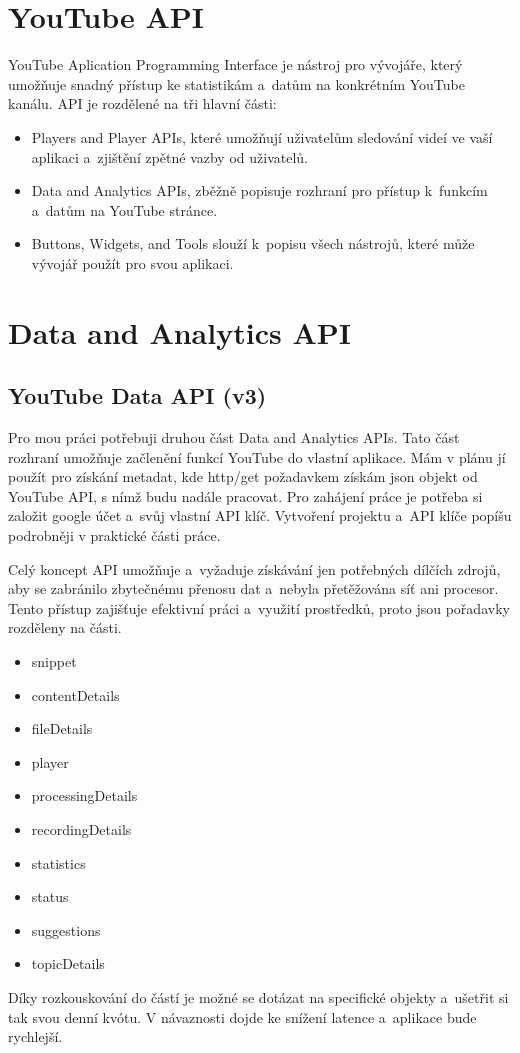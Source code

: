 \section{YouTube API}
\par YouTube Aplication Programming Interface je nástroj pro vývojáře, který umožňuje snadný přístup ke statistikám a~datům na konkrétním YouTube kanálu. API je rozdělené na tři hlavní části:
\begin{itemize}
	\item{Players and Player APIs, které umožňují uživatelům sledování videí ve vaší aplikaci a~zjištění zpětné vazby od uživatelů.}
	\item{Data and Analytics APIs, zběžně popisuje rozhraní pro přístup k~funkcím a~datům na YouTube stránce.}
	\item{Buttons, Widgets, and Tools slouží k~popisu všech nástrojů, které může vývojář použít pro svou aplikaci.}
\end{itemize}

\section{Data and Analytics API}
\subsection{YouTube Data API (v3)}
\par Pro mou práci potřebuji druhou část Data and Analytics APIs. Tato část rozhraní umožňuje začlenění funkcí YouTube do vlastní aplikace. Mám v plánu jí použít pro získání metadat, kde http/get požadavkem získám json objekt od YouTube API, s nímž budu nadále pracovat. Pro zahájení práce je potřeba si založit google účet a~svůj vlastní API klíč. Vytvoření projektu a~API klíče popíšu podrobněji v praktické části práce.
\par Celý koncept API umožňuje a~vyžaduje získávání jen potřebných dílčích zdrojů, aby se zabránilo zbytečnému přenosu dat a~nebyla přetěžována síť ani procesor. Tento přístup zajišťuje efektivní práci a~využití prostředků, proto jsou pořadavky rozděleny na části. 
\begin{itemize} 
\item{snippet}
\item{contentDetails}
\item{fileDetails}
\item{player}
\item{processingDetails}
\item{recordingDetails}
\item{statistics}
\item{status}
\item{suggestions}
\item{topicDetails}
\end{itemize}
\par Díky rozkouskování do částí je možné se dotázat na specifické objekty a~ušetřit si tak svou denní kvótu. V návaznosti dojde ke snížení latence a~aplikace bude rychlejší. 

